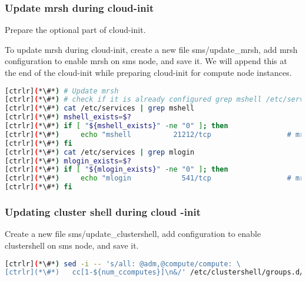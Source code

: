 \subsubsection{Update mrsh during cloud-init}

	Prepare the optional part of cloud-init.

	To update mrsh during cloud-init, create a new file sms/update\_mrsh, add mrsh configuration to enable mrsh on sms node, and save it. We will append this at the end of the cloud-init while preparing cloud-init for compute node instances.


\begin{lstlisting}[language=bash,keywords={}]
[ctrlr](*\#*) # Update mrsh
[ctrlr](*\#*) # check if it is already configured grep mshell /etc/services will return non-zero, else configure"
[ctrlr](*\#*) cat /etc/services | grep mshell
[ctrlr](*\#*) mshell_exists=$?
[ctrlr](*\#*) if [ "${mshell_exists}" -ne "0" ]; then
[ctrlr](*\#*)     echo "mshell          21212/tcp                  # mrshd" >> /etc/services
[ctrlr](*\#*) fi
[ctrlr](*\#*) cat /etc/services | grep mlogin
[ctrlr](*\#*) mlogin_exists=$?
[ctrlr](*\#*) if [ "${mlogin_exists}" -ne "0" ]; then
[ctrlr](*\#*)     echo "mlogin            541/tcp                  # mrlogind" >> /etc/services
[ctrlr](*\#*) fi
\end{lstlisting} 


\subsubsection{Updating cluster shell during cloud -init}
	
	Create a new file sms/update\_clustershell, add configuration to enable clustershell on sms node, and save it. 


\begin{lstlisting}[language=bash,keywords={}]
[ctrlr](*\#*) sed -i -- 's/all: @adm,@compute/compute: \
[ctrlr](*\#*)   cc[1-${num_ccomputes}]\n&/' /etc/clustershell/groups.d/local.cfg
\end{lstlisting} 
 

